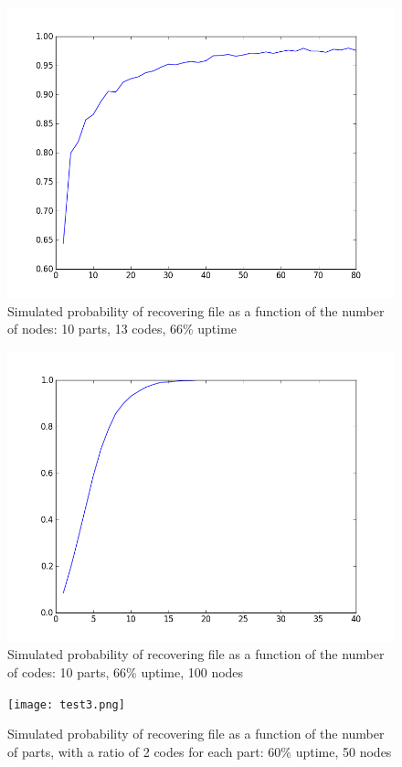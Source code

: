 \documentclass[11pt]{IEEEtran}
\begin{document}
\begin{figure}
\centering
\includegraphics[scale=0.43]{test.png}
\caption{Simulated probability of recovering file as a function of the number of nodes: 10 parts, 13 codes, 66\% uptime}
\end{figure}
\begin{figure}
\centering
\includegraphics[scale=0.43]{test2.png}
\caption{Simulated probability of recovering file as a function of the number of codes: 10 parts, 66\% uptime, 100 nodes}
\end{figure}
\begin{figure}
\centering
\texttt{[image: test3.png]}
\caption{Simulated probability of recovering file as a function of the number of parts, with a ratio of 2 codes for each part: 60\% uptime, 50 nodes}
\end{figure}
\end{document}
